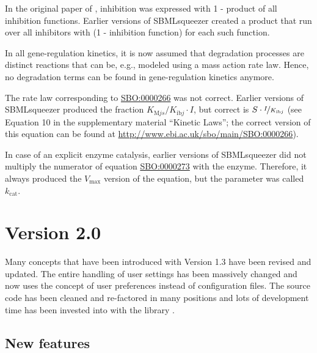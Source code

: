 \begin{dinglist}{54}
\item In the original paper of \citet{Hinze2007}, inhibition was expressed with 1 -
product of all inhibition functions. Earlier versions of SBMLsqueezer created a
product that run over all inhibitors with (1 - inhibition function) for each
such function.

\item In all gene-regulation kinetics, it is now assumed that degradation processes
are distinct reactions that can be, e.g., modeled using a mass action rate law.
Hence, no degradation terms can be found in gene-regulation kinetics anymore.

\item The rate law corresponding to
\href{identifiers.org/biomodels.sbo/SBO:0000266}{SBO:0000266} was not correct.
Earlier versions of SBMLsqueezer produced the fraction $K_{\mathrm{M}js}/K_{\mathrm{ib}j}\cdot I$, but
correct is $S\cdot\nicefrac{I}{K_{\mathrm{ib}j}}$ (see Equation 10 in the supplementary material ``Kinetic
Laws''; the correct version of this equation can be found at
\url{http://www.ebi.ac.uk/sbo/main/SBO:0000266}).

\item In case of an explicit enzyme catalysis, earlier versions of SBMLsqueezer did not
multiply the numerator of equation
\href{identifiers.org/biomodels.sbo/SBO:0000273}{SBO:0000273} with the enzyme.
Therefore, it always produced the $V_\mathrm{max}$ version of the equation, but the parameter
was called $k_\mathrm{cat}$.
\end{dinglist}

\section{Version 2.0}

Many concepts that have been introduced with Version 1.3 have been revised and
updated. The entire handling of user settings has been massively changed and now
uses the concept of user preferences instead of configuration files. The source
code has been cleaned and re-factored in many positions and lots of development
time has been invested into with the library \JSBML.

\subsection{New features}

